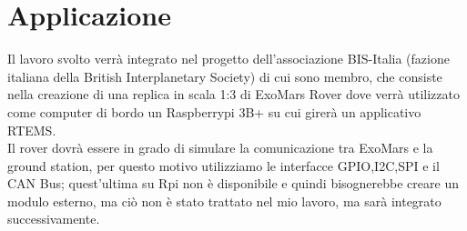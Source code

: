 \documentclass[a4paper,12pt,titlepage,oneside]{book}
\begin{document}
\section*{Applicazione}
Il lavoro svolto verrà integrato nel progetto dell'associazione BIS-Italia (fazione italiana della British Interplanetary Society) di cui sono membro,  che consiste nella creazione di una replica in scala 1:3 di ExoMars Rover dove verrà utilizzato come computer di bordo un Raspberrypi 3B+ su cui girerà un applicativo RTEMS.\\
Il rover dovrà essere in grado di simulare la comunicazione tra ExoMars e la ground station, per questo motivo utilizziamo le interfacce GPIO,I2C,SPI e il CAN Bus; quest'ultima su Rpi non è disponibile e quindi bisognerebbe creare un modulo esterno, ma ciò non è stato trattato nel mio lavoro, ma sarà integrato successivamente.\\
\end{document}
